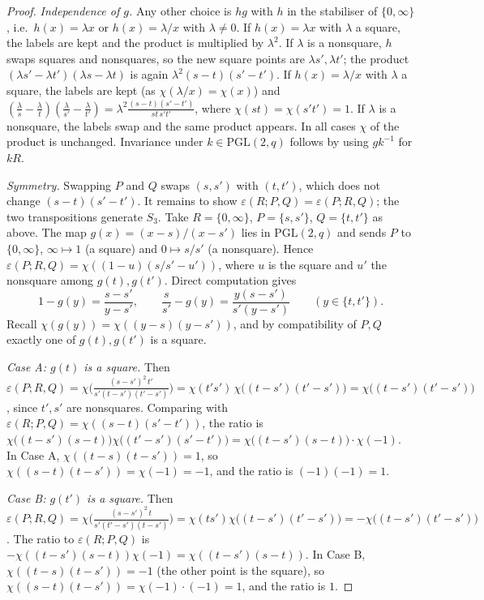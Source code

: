 \documentclass[11pt,a4paper]{article}
\theoremstyle{definition}
\theoremstyle{remark}
\newcommand{\PGL}{\mathrm{PGL}}
\begin{document}
\begin{proof}
\emph{Independence of $g$.} Any other choice is $hg$ with $h$ in the stabiliser of $\{0,\infty\}$, i.e.\
$h(x)=\lambda x$ or $h(x)=\lambda/x$ with $\lambda\ne0$. If $h(x)=\lambda x$ with $\lambda$ a square, the labels are
kept and the product is multiplied by $\lambda^2$. If $\lambda$ is a nonsquare, $h$ swaps squares and nonsquares, so
the new square points are $\lambda s',\lambda t'$; the product $(\lambda s'-\lambda t')(\lambda s-\lambda t)$ is again
$\lambda^2(s-t)(s'-t')$. If $h(x)=\lambda/x$ with $\lambda$ a square, the labels are kept (as $\chi(\lambda/x)=\chi(x)$)
and $(\tfrac\lambda s-\tfrac\lambda t)(\tfrac\lambda{s'}-\tfrac\lambda{t'})=\lambda^2\frac{(s-t)(s'-t')}{st\,s't'}$, where
$\chi(st)=\chi(s't')=1$. If $\lambda$ is a nonsquare, the labels swap and the same product appears. In all cases
$\chi$ of the product is unchanged. Invariance under $k\in\PGL(2,q)$ follows by using $gk^{-1}$ for $kR$.

\emph{Symmetry.} Swapping $P$ and $Q$ swaps $(s,s')$ with $(t,t')$, which does not change $(s-t)(s'-t')$. It remains
to show $\varepsilon(R;P,Q)=\varepsilon(P;R,Q)$; the two transpositions generate $S_3$. Take $R=\{0,\infty\}$,
$P=\{s,s'\}$, $Q=\{t,t'\}$ as above. The map $g(x)=(x-s)/(x-s')$ lies in $\PGL(2,q)$ and sends $P$ to $\{0,\infty\}$,
$\infty\mapsto1$ (a square) and $0\mapsto s/s'$ (a nonsquare). Hence $\varepsilon(P;R,Q)=\chi((1-u)(s/s'-u'))$, where
$u$ is the square and $u'$ the nonsquare among $g(t),g(t')$. Direct computation gives
\[
1-g(y)=\frac{s-s'}{y-s'},\qquad \frac{s}{s'}-g(y)=\frac{y(s-s')}{s'(y-s')}\qquad(y\in\{t,t'\}).
\]
Recall $\chi(g(y))=\chi((y-s)(y-s'))$, and by compatibility of $P,Q$ exactly one of $g(t),g(t')$ is a square.

\emph{Case A: $g(t)$ is a square.} Then
$\varepsilon(P;R,Q)=\chi\bigl(\frac{(s-s')^2\,t'}{s'(t-s')(t'-s')}\bigr)=\chi(t's')\,\chi\bigl((t-s')(t'-s')\bigr)
=\chi\bigl((t-s')(t'-s')\bigr)$, since $t',s'$ are nonsquares. Comparing with
$\varepsilon(R;P,Q)=\chi((s-t)(s'-t'))$, the ratio is
$\chi\bigl((t-s')(s-t)\bigr)\chi\bigl((t'-s')(s'-t')\bigr)=\chi\bigl((t-s')(s-t)\bigr)\cdot\chi(-1)$. In Case A,
$\chi((t-s)(t-s'))=1$, so $\chi((s-t)(t-s'))=\chi(-1)=-1$, and the ratio is $(-1)(-1)=1$.

\emph{Case B: $g(t')$ is a square.} Then $\varepsilon(P;R,Q)=\chi\bigl(\frac{(s-s')^2\,t}{s'(t'-s')(t-s')}\bigr)
=\chi(ts')\chi\bigl((t-s')(t'-s')\bigr)=-\chi\bigl((t-s')(t'-s')\bigr)$. The ratio to $\varepsilon(R;P,Q)$ is
$-\chi((t-s')(s-t))\chi(-1)=\chi((t-s')(s-t))$. In Case B, $\chi((t-s)(t-s'))=-1$ (the other point is the square),
so $\chi((s-t)(t-s'))=\chi(-1)\cdot(-1)=1$, and the ratio is $1$.
\end{proof}
\end{document}
